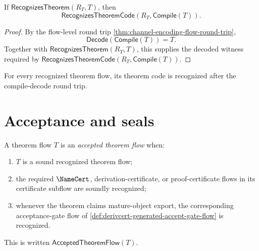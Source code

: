 \begin{theorem}
\label{thm:theorem-generated-compile-decode-preserves-recognition}
If $\mathsf{RecognizesTheorem}(R_T,T)$, then
$$
  \mathsf{RecognizesTheoremCode}(R_T,\mathsf{Compile}(T)).
$$
\end{theorem}

\begin{proof}
By the flow-level round trip \autoref{thm:channel-encoding-flow-round-trip},
$$
  \mathsf{Decode}(\mathsf{Compile}(T))=T.
$$
Together with $\mathsf{RecognizesTheorem}(R_T,T)$, this supplies the decoded witness required by $\mathsf{RecognizesTheoremCode}(R_T,\mathsf{Compile}(T))$.
\end{proof}

\begin{corollary}
\label{cor:theorem-generated-recognition-invariant}
For every recognized theorem flow, its theorem code is recognized after the compile-decode round trip.
\end{corollary}

\section{Acceptance and seals}
\label{sec:theorem-generated-acceptance-seals}

\begin{definition}
\label{def:theorem-generated-accepted-theorem-flow}
A theorem flow $T$ is an \emph{accepted theorem flow} when:
\begin{enumerate}
\item $T$ is a sound recognized theorem flow;
\item the required $\NameCert$, derivation-certificate, or proof-certificate flows in its certificate subflow are soundly recognized;
\item whenever the theorem claims mature-object export, the corresponding acceptance-gate flow of \autoref{def:derivcert-generated-accept-gate-flow} is recognized.
\end{enumerate}
This is written $\mathsf{AcceptedTheoremFlow}(T)$.
\end{definition}

